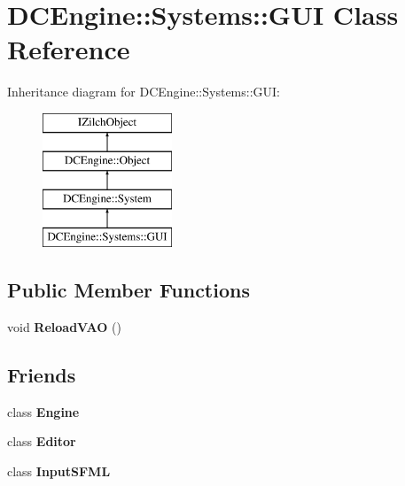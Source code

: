\hypertarget{classDCEngine_1_1Systems_1_1GUI}{\section{D\-C\-Engine\-:\-:Systems\-:\-:G\-U\-I Class Reference}
\label{classDCEngine_1_1Systems_1_1GUI}
}
Inheritance diagram for D\-C\-Engine\-:\-:Systems\-:\-:G\-U\-I\-:\begin{figure}[H]
\begin{center}
\leavevmode
\includegraphics[height=4.000000cm]{classDCEngine_1_1Systems_1_1GUI}
\end{center}
\end{figure}
\subsection*{Public Member Functions}
\begin{DoxyCompactItemize}
\item 
\hypertarget{classDCEngine_1_1Systems_1_1GUI_a7d35966ef7bf411cab04fa018b2737dd}{void {\bfseries Reload\-V\-A\-O} ()}\label{classDCEngine_1_1Systems_1_1GUI_a7d35966ef7bf411cab04fa018b2737dd}

\end{DoxyCompactItemize}
\subsection*{Friends}
\begin{DoxyCompactItemize}
\item 
\hypertarget{classDCEngine_1_1Systems_1_1GUI_a3e1914489e4bed4f9f23cdeab34a43dc}{class {\bfseries Engine}}\label{classDCEngine_1_1Systems_1_1GUI_a3e1914489e4bed4f9f23cdeab34a43dc}

\item 
\hypertarget{classDCEngine_1_1Systems_1_1GUI_ae8a991e13e07be28086d82e28524e64f}{class {\bfseries Editor}}\label{classDCEngine_1_1Systems_1_1GUI_ae8a991e13e07be28086d82e28524e64f}

\item 
\hypertarget{classDCEngine_1_1Systems_1_1GUI_a75463b7fc04ee0ed91ae84990048dce6}{class {\bfseries Input\-S\-F\-M\-L}}\label{classDCEngine_1_1Systems_1_1GUI_a75463b7fc04ee0ed91ae84990048dce6}

\end{DoxyCompactItemize}
